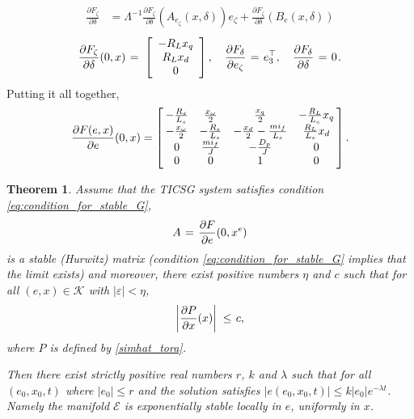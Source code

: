 \documentclass[letterpaper,10pt,conference]{ieeeconf}
\newtheorem{theorem}{Theorem}[section]
\newcommand{\BE}{\begin{equation}}
\newcommand{\BEQ}[1]{\BE\label{#1}} %
\renewcommand{\l}    {{\lambda}}
\renewcommand{\L}    {{\Lambda}}
\renewcommand{\o}    {{\omega}}
\newcommand{\e}      {{\varepsilon}}
\newcommand{\m}      {{\hbox{\hskip 1pt}}}
\newcommand{\nm}     {{\hbox{\hskip -3pt}}}
\newcommand{\Emscr}  {{\mathcal{E}}}
\newcommand{\Kmscr}  {{\mathcal{K}}}
\begin{document}
$$ \begin{aligned} \frac{\partial F_\zeta}{\partial \delta} & =  
   \L^{-1} \frac{\partial F_\zeta}{\partial \delta}\left( 
   A_{e_\zeta}(x,\delta) \right)e_\zeta + \frac{\partial F_\zeta}
   {\partial \delta}\left(B_e(x,\delta)\right) \end{aligned}$$
$$ \frac{\partial F_\zeta}{\partial \delta}(0,x) \m=\m \left[
   \begin{array}{ccc} -R_L x_q\\ R_L x_d\\ 0\end{array}\right],
   \quad \frac{\partial F_\delta}{\partial e_\zeta} \m=\m 
   e_3^\top,\quad \frac{\partial F_\delta}{\partial \delta}
   \m=\m 0 \m.$$
Putting it all together,
\begin{equation} \label{eq:AOft}
   \frac{\partial F(e,x)}{\partial e}(0,x) = \left[\nm
   \begin{array}{cccc} -\frac{R_s}{L_s} & \frac{x_{\o}}{2} & 
   \frac{x_q}{2} & -\frac{R_L}{L_s} x_q\\ -\frac{x_{\o}}{2} &
   -\frac{R_s}{L_s} & -\frac{x_d}{2}-\frac{mi_f}{L_s} & 
   \frac{R_L}{L_s} x_d\\ 0 & \frac{mi_f}{J} & -\frac{D_p}{J} 
   & 0\\ 0 & 0 & 1 & 0 \end{array} \nm\right].
\end{equation}

\begin{theorem} \label{theorem:TICSGSync}
Assume that the TICSG system satisfies condition 
\eqref{eq:condition_for_stable_G}, \vspace{-3mm}
\begin{equation} \label{eq:eLinearizationLimit}
   A \m=\m \frac{\partial F}{\partial e}(0,x^e)
\end{equation}
is a stable (Hurwitz) matrix (condition
\eqref{eq:condition_for_stable_G} implies that the limit exists) and
moreover, there exist positive numbers $\eta$ and $c$ such that for
all $(e,x)\in\Kmscr$ with $|\e|<\eta$,
\BEQ{P_C1}
   \left| \frac{\partial P}{\partial x}(x)\right| \m\leq\m c,
\end{equation}
where $P$ is defined by \eqref{simhat_tora}. 

Then there exist strictly positive real numbers $r$, $k$ and $\l$ such
that for all $\left(e_0, x_0, t\right)$ where $\left|e_0\right|\leq r$
and the solution satisfies $\left| e\left( e_0,x_0,t\right)\right|\leq
k\left|e_0\right|e^{-\l t}$. Namely the manifold $\Emscr$ is
exponentially stable locally in $e$, uniformly in $x$.
\end{theorem}
 
\end{document}
